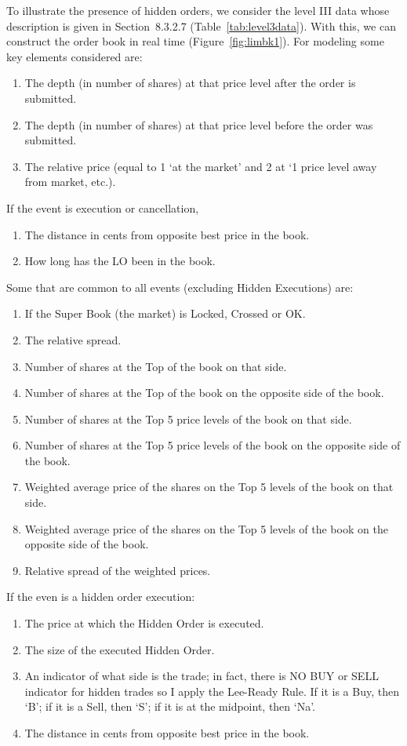 To illustrate the presence of hidden orders, we consider the level III data whose description is given in Section~8.3.2.7 (Table~\ref{tab:level3data}). With this, we can construct the order book in real time (Figure~\ref{fig:limbk1}). For modeling some key elements considered are:
\begin{enumerate}[--]
\item The depth (in number of shares) at that price level after the order is submitted.
\item The depth (in number of shares) at that price level before the order was submitted.
\item The relative price (equal to 1 `at the market' and 2 at `1 price level away from market, etc.). 
\end{enumerate}
If the event is execution or cancellation,
\begin{enumerate}[--]
\item The distance in cents from opposite best price in the book.
\item How long has the LO been in the book.
\end{enumerate}
Some that are common to all events (excluding Hidden Executions) are:
\begin{enumerate}[--]
\item If the Super Book (the market) is Locked, Crossed or OK.
\item The relative spread.
\item Number of shares at the Top of the book on that side.
\item Number of shares at the Top of the book on the opposite side of the book.
\item Number of shares at the Top 5 price levels of the book on that side.
\item Number of shares at the Top 5 price levels of the book on the opposite side of the book.
\item Weighted average price of the shares on the Top 5 levels of the book on that side.
\item Weighted average price of the shares on the Top 5 levels of the book on the opposite side of the book.
\item Relative spread of the weighted prices.
\end{enumerate}
If the even is a hidden order execution:
\begin{enumerate}[--]
\item The price at which the Hidden Order is executed.
\item The size of the executed Hidden Order.
\item An indicator of what side is the trade; in fact, there is NO BUY or SELL indicator for hidden trades so I apply the Lee-Ready Rule. If it is a Buy, then `B'; if it is a Sell, then `S'; if it is at the midpoint, then `Na'.
\item The distance in cents from opposite best price in the book.
\end{enumerate}


